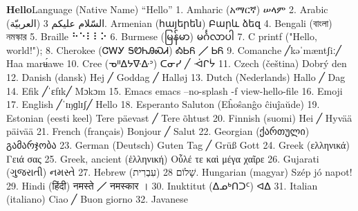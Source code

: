 \documentclass[11pt]{article}
\begin{document}
\vspace{1em}\textbf{Hello}\quad\label{org-special-block-extras-glossary-Hello}Language (Native Name) “Hello” 1. Amharic (አማርኛ)	ሠላም 2. Arabic (العربيّة)	السّلام عليكم 3. Armenian (հայերեն)	Բարև ձեզ 4. Bengali (বাংলা)	নমস্কার 5. Braille	⠓⠑⠇⠇⠕ 6. Burmese (မြန်မာ)	မင်္ဂလာပါ 7. C	printf ("Hello, world!\n"); 8. Cherokee (ᏣᎳᎩ ᎦᏬᏂᎯᏍᏗ)	ᎣᏏᏲ ╱ ᏏᏲ 9. Comanche ╱kəˈmæntʃiː╱	Haa marʉ́awe 10. Cree (ᓀᐦᐃᔭᐍᐏᐣ)	ᑕᓂᓯ ╱ ᐙᒋᔮ 11. Czech (čeština)	Dobrý den 12. Danish (dansk)	Hej ╱ Goddag ╱ Halløj 13. Dutch (Nederlands)	Hallo ╱ Dag 14. Efik \quad ╱ˈɛfɪk╱	Mɔkɔm 15. Emacs	emacs --no-splash -f view-hello-file \newline{\color{white}.}16. Emoji	👋 17. English ╱ˈɪŋɡlɪʃ╱	Hello 18. Esperanto	Saluton (Eĥoŝanĝo ĉiuĵaŭde) 19. Estonian (eesti keel)	Tere päevast ╱ Tere õhtust 20. Finnish (suomi)	Hei ╱ Hyvää päivää 21. French (français)	Bonjour ╱ Salut \newline{\color{white}.}22. Georgian (ქართული)	გამარჯობა 23. German (Deutsch)	Guten Tag ╱ Grüß Gott \newline{\color{white}.}24. Greek (ελληνικά)	Γειά σας 25. Greek, ancient (ἑλληνική)	Οὖλέ τε καὶ μέγα χαῖρε \newline{\color{white}.}26. Gujarati (ગુજરાતી)	નમસ્તે 27. Hebrew (עִבְרִית)	שָׁלוֹם 28. Hungarian (magyar)	Szép jó napot! 29. Hindi (हिंदी)	नमस्ते ╱ नमस्कार । 30. Inuktitut (ᐃᓄᒃᑎᑐᑦ)	ᐊᐃ 31. Italian (italiano)	Ciao ╱ Buon giorno 32. Javanese 
\end{document}
